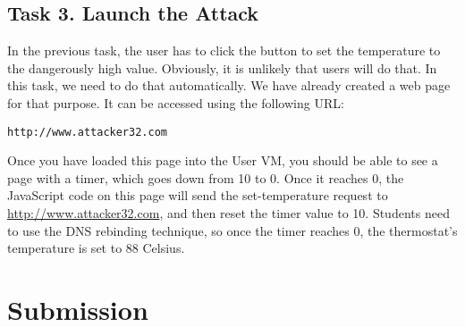 \subsection{Task 3. Launch the Attack}

In the previous task, the user has to click the button to set the 
temperature to the dangerously high value. Obviously, it is unlikely that users will 
do that.  In this task, we need to do that automatically. We have already created 
a web page for that purpose. It can be accessed using the following URL:


\begin{lstlisting}
http://www.attacker32.com
\end{lstlisting}
 

Once you have loaded this page into the User VM, you should be able to see a page with a 
timer, which goes down from 10 to 0. Once it reaches 0, the JavaScript code 
on this page will send the set-temperature request to 
\url{http://www.attacker32.com}, and then reset the timer value to 10. 
Students need to use the DNS rebinding technique, so
once the timer reaches 0, the thermostat's temperature is set to 
88 Celsius. 



\section{Submission}






